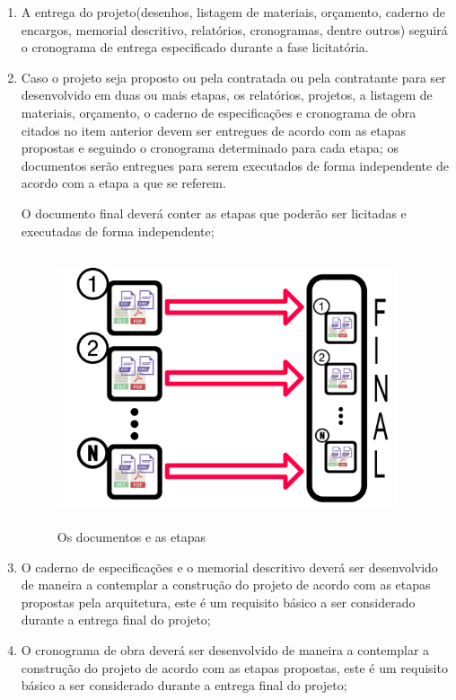 \begin{enumerate}
	\item A entrega do projeto(desenhos, listagem de materiais, orçamento, caderno de encargos, memorial descritivo, relatórios, cronogramas, dentre outros) seguirá o cronograma de entrega especificado durante a fase licitatória.
	
	\item Caso o projeto seja proposto ou pela contratada ou pela contratante para ser desenvolvido em duas ou mais etapas, os relatórios, projetos, a listagem de materiais, orçamento, o caderno de especificações e cronograma de obra citados no item anterior devem ser entregues de acordo com as etapas propostas e seguindo o cronograma determinado para cada etapa; os documentos serão entregues para serem executados de forma independente de acordo com a etapa a que se referem.
	
	O documento final deverá conter as etapas que poderão ser licitadas e executadas de forma independente;

	\begin{figure}[H]
		\centering
		\includegraphics[width=10cm,height=8cm,keepaspectratio]{Figures/2. General Settings/etapas_docs.png}
		\hfill
		\caption{Os documentos e as etapas }
		\label{fig: divisao_etapas}
	\end{figure}
	
	\item O caderno de especificações e o memorial descritivo deverá ser desenvolvido de maneira a contemplar a construção do projeto de acordo com as etapas propostas pela arquitetura, este é um requisito básico a ser considerado durante a entrega final do projeto;
	
	\item O cronograma de obra deverá ser desenvolvido de maneira a contemplar a construção do projeto de acordo com as etapas propostas, este é um requisito básico a ser considerado durante a entrega final do projeto;
	

\end{enumerate}
